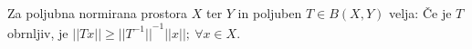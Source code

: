\documentclass[mat2]{matdelo}
\newcommand{\N}{\mathbb{N}}
\newcommand{\abs}[1]{\ensuremath{\lvert #1 \rvert}}
\newcommand{\norm}[1]{\abs{\abs{#1}}}
\begin{document}
		\begin{lema}
			\label{lem:invnorm}
			Za poljubna normirana prostora $X$ ter $Y$ in poljuben $T\in B(X, Y)$ velja: Če je $T$ obrnljiv, je $\norm{Tx}\geq \norm{T^{-1}}^{-1}\norm{x};~\forall x\in X$.
		\end{lema}
		
\end{document}
